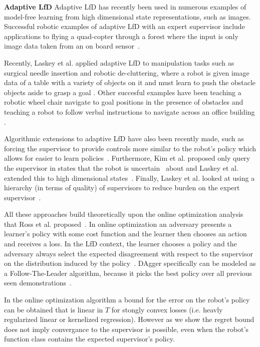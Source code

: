 \documentclass[10pt, conference]{ieeeconf}      %
\begin{document}
\noindent \textbf{Adaptive LfD}
Adaptive LfD has recently been used in numerous examples of model-free learning from high dimensional state representations, such as images. Successful robotic examples of adaptive LfD with an expert supervisor include applications to flying a quad-copter through a forest where the input is only image data taken from an on board sensor~\cite{ross2013learning}.

 Recently, Laskey et al. applied adaptive LfD to manipulation tasks such as surgical needle insertion \cite{laskeyshiv} and robotic de-cluttering, where a robot is given image data of a table with a variety of objects on it and must learn to push the obstacle objects aside to grasp a goal \cite{laskeyrobot}. Other succesful examples have been teaching a robotic wheel chair navigate to goal positions in the presence of obstacles and teaching a robot to follow verbal instructions to navigate across an office building \cite{kim2013maximum, duvallet2013imitation}. 

Algorithmic extensions to adaptive LfD have also been recently made, such as  forcing the supervisor to provide controls more similar to the robot's policy which allows for easier to learn policies~\cite{he2012imitation}. Furthermore, Kim et al. proposed only query the supervisor in states that the robot is uncertain~\cite{kim2013maximum} about and Laskey et al. extended this to high dimensional states~\cite{laskeyshiv}. Finally, Laskey et al. looked at using a hierarchy (in terms of quality) of supervisors to reduce burden on the expert supervisor~\cite{laskeyrobot}.

All these approaches build theoretically upon the online optimization analysis that Ross et al. proposed~\cite{ross2010reduction}. In online optimization an adversary presents a learner's policy with some cost function and the learner then chooses an action and receives a loss. In the LfD context, the learner chooses a policy and the adversary always select the expected disagreement with respect to the supervisor on the distribution induced by the policy~\cite{shalev2011online}. DAgger specifically can be modeled as a Follow-The-Leader algorithm, because it picks the best policy over all previous seen demonstrations~\cite{ross2010reduction}.

In the online optimization algorithm a bound for the error on the robot's policy can be obtained that is linear in $T$ for stongly convex losses (i.e. heavly regularized linear or kernelized regression). However as we show the regret bound does not imply convergance to the supervisor is possible, even when the robot's function class contains the expected supervisor's policy. 
\end{document}
